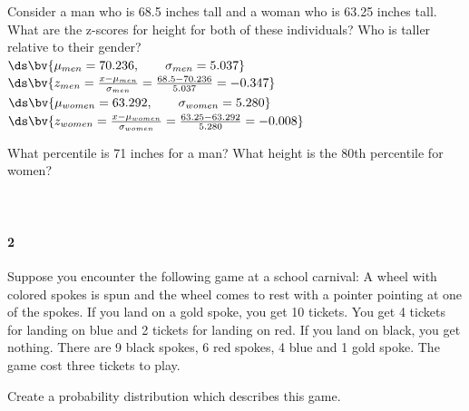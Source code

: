 \documentclass{article}
\begin{document}
\begin{flushleft}
\begin{enumalpha}
\newpage
\item Consider a man who is 68.5 inches tall and a woman who is 63.25 inches tall. What are the z-scores for height for both of these individuals? Who is taller relative to their gender?\\
\medskip
$\ds \bv{\mu_{men} = 	70.236, \qquad \sigma_{men} = 5.037}$\\ \medskip
$\ds \bv{z_{men} = \frac{x - \mu_{men}}{\sigma_{men}} = \frac{68.5 -70.236}{5.037} = -0.347 }$\\
\bigskip
$\ds \bv{\mu_{women} = 	63.292, \qquad \sigma_{women} = 5.280}$\\ \medskip
$\ds \bv{z_{women} = \frac{x - \mu_{women}}{\sigma_{women}} = \frac{63.25 -63.292}{5.280} = -0.008 }$\\
\bigskip
{}
\vspace{1in}

\item What percentile is 71 inches for a man? What height is the 80th percentile for women?\\
\medskip
{}\\ \smallskip
{}\\
\bigskip



\end{enumalpha}

\newpage
\paragraph{2} Suppose you encounter the following game at a school carnival: A wheel with colored spokes is spun and the wheel comes to rest with a pointer pointing at one of the spokes. If you land on a gold spoke, you get 10 tickets. You get 4 tickets for landing on blue and 2 tickets for landing on red. If you land on black, you get nothing. There are 9 black spokes, 6 red spokes, 4 blue and 1 gold spoke. The game cost three tickets to play.

\begin{enumalpha}
\item Create a probability distribution which describes this game.\\
\medskip
{\centering {} \par}
\vspace{0.5in}


\end{enumalpha}
\end{flushleft}
\end{document}
